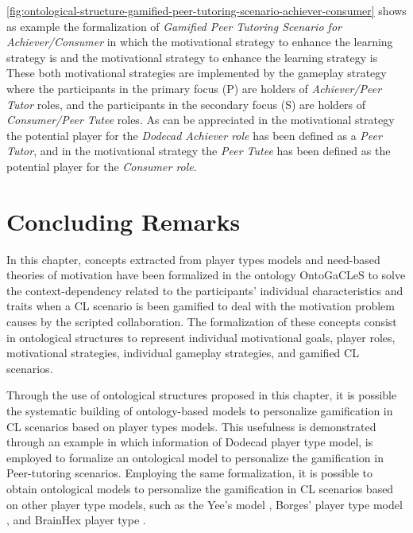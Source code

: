 \autoref{fig:ontological-structure-gamified-peer-tutoring-scenario-achiever-consumer} shows as example the formalization of \emph{Gamified Peer Tutoring Scenario for Achiever/Consumer} in which the motivational strategy to enhance the learning strategy  is  and the motivational strategy to enhance the learning strategy  is  These both motivational strategies are implemented by the gameplay strategy  where the participants in the primary focus (P) are holders of \emph{Achiever/Peer Tutor} roles, and the participants in the secondary focus (S) are holders of \emph{Consumer/Peer Tutee} roles. As can be appreciated in the motivational strategy  the potential player for the \emph{Dodecad Achiever role} has been defined as a \emph{Peer Tutor}, and in the motivational strategy  the \emph{Peer Tutee} has been defined as the potential player for the \emph{Consumer role}. 



\section{Concluding Remarks}
\label{sec:ontogacles1-concluding-remarks}

In this chapter, concepts extracted from player types models and need-based theories of motivation have been formalized in the ontology OntoGaCLeS to solve the context-dependency related to the participants' individual characteristics and traits when a CL scenario is been gamified to deal with the motivation problem causes by the scripted collaboration. The formalization of these concepts consist in ontological structures to represent individual motivational goals, player roles, motivational strategies, individual gameplay strategies, and gamified CL scenarios.

Through the use of ontological structures proposed in this chapter, it is possible the systematic building of ontology-based models to personalize gamification in CL scenarios based on player types models. This usefulness is demonstrated through an example in which information of Dodecad player type model, is employed to formalize an ontological model to personalize the gamification in Peer-tutoring scenarios. Employing the same formalization, it is possible to obtain ontological models to personalize the gamification in CL scenarios based on other player type models, such as the Yee's model \cite{Yee2006}, Borges' player type model \cite{BorgesMizoguchiDurelliBittencourtIsotani2016}, and BrainHex player type \cite{NackeBatemanMandryk2014}.

